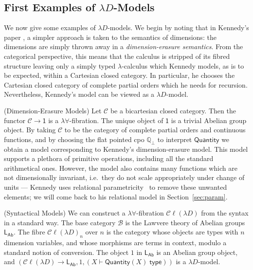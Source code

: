\documentclass[a4paper,UKenglish]{lipics}
\theoremstyle{plain}
\newcommand{\ra}{\rightarrow}
\newcommand{\msf}[1]{\mathsf{#1}} %
\newcommand{\LAb}{\msf{L}_{\msf{Ab}}}
\newcommand{\terminal}{\msf{1}}
\newcommand{\ClLD}{\mathcal{C\ell}(\lambda{}D)} %
\newcommand{\B}{\mathcal{B}}
\newcommand{\C}{\mathcal{C}}
\newcommand{\bbQ}{\mathbb{Q}}
\newcommand{\qnt}{\msf{Quantity}}
\newcommand{\Tj}[2]{#1 \vdash #2 \; \msf{ type}}
\begin{document}
\subsection{First Examples of \texorpdfstring{$\lambda D$}{lambdaD}-Models}
We now give some examples of $\lambda D$-models. We begin by noting
that in Kennedy's paper \cite{Kennedy:1997:RPU:263699.263761}, a
simpler approach is taken to the semantics of dimensions: the
dimensions are simply thrown away in a {\em dimension-erasure
  semantics}. From the categorical perspective, this means that the
calculus is stripped of its fibred structure leaving only a simply
typed $\lambda$-calculus which Kennedy models, as is to be expected,
within a Cartesian closed category. In particular, he chooses the
Cartesian closed category of complete partial orders which he needs
for recursion. Nevertheless, Kennedy's model can be viewed as a
$\lambda D$-model.


\begin{example}(Dimension-Erasure Models)
\label{ex:UnitErasure}
Let $\C$ be a bicartesian closed category. Then the functor $\C \ra
\terminal$ is a $\lambda\forall$-fibration. The unique object of
$\terminal$ is a trivial Abelian group object. By taking $\C$ to be
the category of complete partial orders and continuous functions, and
by choosing the flat pointed cpo $\bbQ_{\bot}$ to interpret $\qnt$ we
obtain a model corresponding to Kennedy's dimension-erasure
model. This model supports a plethora of primitive operations,
including all the standard arithmetical ones. However, the model also
contains many functions which are not dimensionally invariant, i.e.\
they do not scale appropriately under change of units --- Kennedy uses
relational parametricity~\cite{reynolds1983types} to remove these
unwanted elements; we will come back to his relational model in
Section~\ref{sec:param}.
\end{example}


\begin{example}(Syntactical Models)
We can construct a $\lambda \forall$-fibration $\ClLD$ from the syntax in a standard way. The base category $\B$ is the Lawvere theory of Abelian groups $\LAb$. The fibre $\ClLD_n$ over $n$ is the category whose objects are types with $n$ dimension variables, and whose morphisms are terms in context, modulo a standard notion of conversion. The object $1$ in $\LAb$ is an Abelian group object, and $(\ClLD\to\LAb,1,(\Tj X{\qnt(X)}))$ is a $\lambda D$-model.
\end{example}
\end{document}
